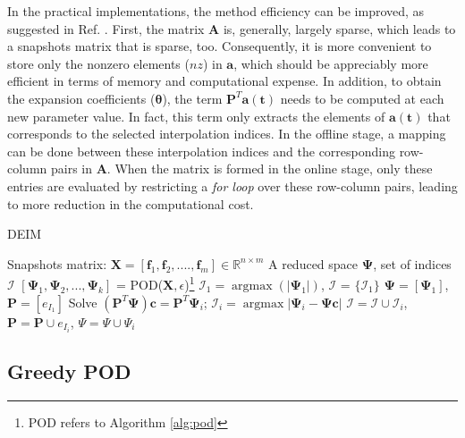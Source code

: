 \documentclass[]{interact}
\DeclareMathOperator{\argmaxH}{argmax}
\newcommand\abs[1]{\left|#1\right|}
\theoremstyle{plain}%
\theoremstyle{definition}
\theoremstyle{remark}
\begin{document}
In the practical implementations, the method efficiency can be improved, as suggested in Ref. \cite{negri2015efficient}.
First, the matrix $\mathbf{A}$ is, generally, largely sparse, which leads to a snapshots matrix that is sparse, too.
Consequently, it is more convenient to store only the nonzero elements ($nz$) in $\mathbf{a}$, 
which should be appreciably more efficient in terms of memory and computational expense.
In addition, to obtain the expansion coefficients ($\boldsymbol{\theta}$), the term $\mathbf{P}^T\mathbf{a(t)}$ needs to be computed at each new parameter value.
In fact, this term only extracts the elements of $\mathbf{a(t)}$ that corresponds to the selected  interpolation indices.
In the offline stage, a mapping can be done between these interpolation indices and the corresponding row-column pairs in $\mathbf{A}$.
When the matrix is formed in the online stage, only these entries are evaluated by restricting a \textit{for loop} over these row-column pairs, leading to more reduction in the computational cost.

\noindent\begin{minipage}{\textwidth}
	\renewcommand\footnoterule{}
	\begin{algorithm}[H]
		\caption{DEIM}
		\label{alg:DEIM}
		\begin{algorithmic}[1]
			\REQUIRE Snapshots matrix: $\mathbf{X} = [\mathbf{f}_1, \mathbf{f}_2,  ...., \mathbf{f}_m] \in \mathbb{R}^{n\times m}$
			\ENSURE A reduced space $\mathbf{\Psi}$, set of indices $\mathcal{I}$
			\STATE $[\mathbf{\Psi}_1, \mathbf{\Psi}_2, ..., \mathbf{\Psi}_k ]$ = POD(${\mathbf{X}}, \epsilon$)\footnote{POD refers to Algorithm \ref{alg:pod}}
			\STATE $\mathcal{I}_1 = \argmaxH(\abs{\mathbf{\Psi}_1})$, $\mathcal{I}$ = $\{\mathcal{I}_1\}$
			\STATE $\mathbf{\Psi} = [\mathbf{\Psi}_1]$, $\mathbf{P} =[e_{I_1}]$
			\STATE Solve $(\mathbf{P}^T\mathbf{\Psi})\mathbf{c} = \mathbf{P}^T\mathbf{\Psi}_i$;
			\STATE $\mathcal{I}_i = \argmaxH{\abs{\mathbf{\Psi}_i - \mathbf{\Psi}\mathbf{c}}}$
			\STATE $\mathcal{I} = \mathcal{I} \cup \mathcal{I}_i$, $\mathbf{P} = \mathbf{P} \cup e_{I_i}$, ${\Psi = \Psi \cup \Psi_i}$
			\ENDFOR
		\end{algorithmic}
	\end{algorithm}
\end{minipage}


\subsection{Greedy POD}
\label{sec:POD}
\end{document}
